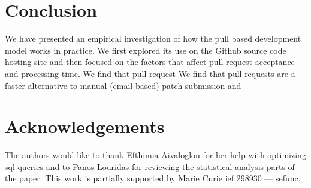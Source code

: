 \documentclass{acm_proc_article-sp}
\begin{document}
\section{Conclusion}

We have presented an empirical investigation of how the pull based development
model works in practice. We first explored its use on the Github source code
hosting site and then focused on the factors that affect pull request acceptance and processing time. We find that pull request 
We find that pull requests are a faster alternative
to manual (email-based) patch submission and 

\section*{Acknowledgements}

The authors would like to thank Efthimia Aivaloglou for her help with 
optimizing {\sc sql} queries and to Panos Louridas for reviewing the 
statistical analysis parts of the paper.
This work is partially supported by Marie Curie {\sc ief} 298930 --- {\sc sefunc}.


\balance

\end{document}
